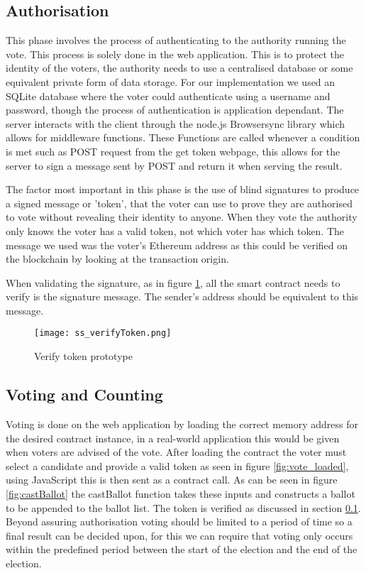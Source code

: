 \documentclass{entcs}
\begin{document}
\subsection{Authorisation}\label{sec: Auth}
This phase involves the process of authenticating to the authority running the vote. This process is solely done in the web application. This is to protect the identity of the voters, the authority needs to use a centralised database or some equivalent private form of data storage. For our implementation we used an SQLite database where the voter could authenticate using a username and password, though the process of authentication is application dependant. The server interacts with the client through the node.js Browsersync library which allows for middleware functions. These Functions are called whenever a condition is met such as POST request from the get token webpage, this allows for the server to sign a message sent by POST and return it when serving the result.

The factor most important in this phase is the use of blind signatures to produce a signed message or 'token', that the voter can use to prove they are authorised to vote without revealing their identity to anyone. When they vote the authority only knows the voter has a valid token, not which voter has which token. The message we used was the voter's Ethereum address as this could be verified on the blockchain by looking at the transaction origin.

When validating the signature, as in figure \ref{fig:verifyToken}, all the smart contract needs to verify is the signature message. The sender's address should be equivalent to this message.

\begin{figure}[h!]
    \centering
    \texttt{[image: ss\_verifyToken.png]}
    \caption{Verify token prototype}
    \label{fig:verifyToken}
\end{figure}

\subsection{Voting and Counting} \label{sec: voting and counting}
Voting is done on the web application by loading the correct memory address for the desired contract instance, in a real-world application this would be given when voters are advised of the vote. After loading the contract the voter must select a candidate and provide a valid token as seen in figure \ref{fig:vote_loaded}, using JavaScript this is then sent as a contract call. As can be seen in figure \ref{fig:castBallot} the castBallot function takes these inputs and constructs a ballot to be appended to the ballot list. The token is verified as discussed in section \ref{sec: Auth}. 
Beyond assuring authorisation voting should be limited to a period of time so a final result can be decided upon, for this we can require that voting only occurs within the predefined period between the start of the election and the end of the election.
\end{document}
